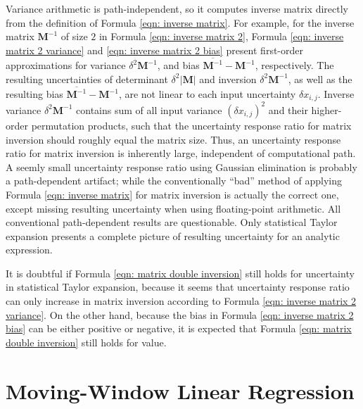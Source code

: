 \documentclass[twoside]{article}
\numberwithin{equation}{section}
\newcommand{\Verbose}{}
\begin{document}
Variance arithmetic is path-independent, so it computes inverse matrix directly from the definition of Formula \eqref{eqn: inverse matrix}.
For example, for the inverse matrix $\mathbf{M}^{-1}$ of size $2$ in Formula \eqref{eqn: inverse matrix 2}, Formula \eqref{eqn: inverse matrix 2 variance} and \eqref{eqn: inverse matrix 2 bias} present first-order approximations for variance $\delta^2 \mathbf{M}^{-1}$, and bias $\overline{\mathbf{M}^{-1}} - \mathbf{M}^{-1}$, respectively. 
The resulting uncertainties of determinant $\delta^2 |\mathbf{M}|$ and inversion $\delta^2 \mathbf{M}^{-1}$, as well as the resulting bias $\overline{\mathbf{M}^{-1}} - \mathbf{M}^{-1}$, are not linear to each input uncertainty $\delta x_{i,j}$.
Inverse variance $\delta^2 \mathbf{M}^{-1}$ contains sum of all input variance $(\delta x_{i,j})^2$ and their higher-order permutation products, such that the uncertainty response ratio for matrix inversion should roughly equal the matrix size.
Thus, an uncertainty response ratio for matrix inversion is inherently large, independent of computational path.
A seemly small uncertainty response ratio using Gaussian elimination \cite{Numerical_Recipes}\cite{Linear_Algebra} is probably a path-dependent artifact; while the conventionally ``bad'' method of applying Formula \eqref{eqn: inverse matrix} for matrix inversion \cite{Numerical_Recipes}\cite{Linear_Algebra} is actually the correct one, except missing resulting uncertainty when using floating-point arithmetic.
All conventional path-dependent results are questionable.
Only statistical Taylor expansion presents a complete picture of resulting uncertainty for an analytic expression.

It is doubtful if Formula \eqref{eqn: matrix double inversion} still holds for uncertainty in statistical Taylor expansion, because it seems that uncertainty response ratio can only increase in matrix inversion according to Formula \eqref{eqn: inverse matrix 2 variance}.
On the other hand, because the bias in Formula \eqref{eqn: inverse matrix 2 bias} can be either positive or negative, it is expected that Formula \eqref{eqn: matrix double inversion} still holds for value.






\ifdefined\Verbose
\clearpage
\fi
\section{Moving-Window Linear Regression}
\label{sec: Moving-Window Linear Regression}
\end{document}
